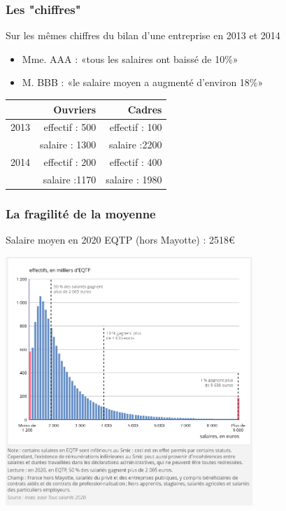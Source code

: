\documentclass{beamer}
\begin{document}
\begin{frame}
\frametitle{Les "chiffres"}


Sur les mêmes chiffres du bilan d’une entreprise en 2013 et 2014

    \begin{itemize} 
    \item Mme. AAA : «tous les salaires ont baissé de 10\%»
    \item M. BBB : «le salaire moyen a augmenté d’environ 18\%»
  \end{itemize}
  
\begin{table}[]
\begin{tabular}{|l|r|r|}
\hline
\textbf{} & \textbf{Ouvriers} & \textbf{Cadres} \\ \hline
2013      & effectif : 500    & effectif : 100  \\ \hline
          & salaire : 1300    & salaire :2200   \\ \hline
2014      & effectif : 200    & effectif : 400  \\ \hline
          & salaire :1170     & salaire : 1980  \\ \hline
\end{tabular}
\end{table}

\end{frame}


\begin{frame}
\frametitle{La fragilité  de la moyenne}


Salaire moyen en 2020 EQTP (hors Mayotte) : 2518€ 

\centering
\includegraphics[width=0.7\textwidth,keepaspectratio]{img/salaire.png}


\end{frame}
\end{document}
